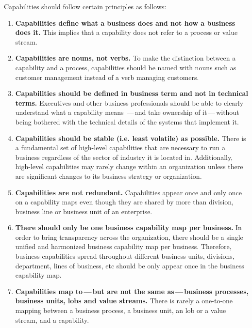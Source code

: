 Capabilities should follow certain principles as follows:

\begin{enumerate}
    \item \textbf{Capabilities define what a business does and not how a business does it.}
          This implies that a capability does not refer to a process or value stream.
    \item \textbf{Capabilities are nouns, not verbs.}
          To make the distinction between a capability and a process, capabilities should be named with nouns such as
          customer management instead of a verb managing customers.
    \item \textbf{Capabilities should be defined in business term and not in technical terms.}
          Executives and other business professionals should be able to clearly understand what a capability means
          \,---\,and take ownership of it\,---\,without being bothered with the technical details of the systems
          that implement it.
    \item \textbf{Capabilities should be stable (i.e. least volatile) as possible.}
          There is a fundamental set of high-level capabilities that are necessary to run a business regardless
          of the sector of industry it is located in. Additionally, high-level capabilities may rarely change
          within an organization unless there are significant changes to its business strategy or organization.
    \item \textbf{Capabilities are not redundant.}
          Capabilities appear once and only once on a capability maps even though they are shared by more than division,
          business line or business unit of an enterprise.
    \item \textbf{There should only be one business capability map per business.}
          In order to bring transparency across the organization, there should be a single unified and harmonized
          business capability map per business.
          Therefore, business capabilities spread throughout different business units, divisions, department,
          lines of business, etc should be only appear once in the business capability map.
    \item \textbf{Capabilities map to\,---\,but are not the same as\,---\,business processes, business units,
          \glspl{lob} and value streams.}
          There is rarely a one-to-one mapping between a business process, a business unit, an \gls{lob} or
          a value stream, and a capability.

\end{enumerate}
